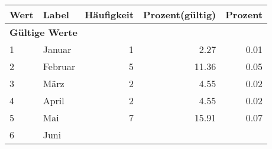      \begin{longtable}{lXrrr}
     \toprule
     \textbf{Wert} & \textbf{Label} & \textbf{Häufigkeit} & \textbf{Prozent(gültig)} & \textbf{Prozent} \\
     \endhead
     \midrule
     \multicolumn{5}{l}{\textbf{Gültige Werte}}\\

     1 &
     \multicolumn{1}{X}{ Januar   } &


       \num{1} &
       \num[round-mode=places,round-precision=2]{2,27} &
         \num[round-mode=places,round-precision=2]{0,01} \\

     2 &
     \multicolumn{1}{X}{ Februar   } &


       \num{5} &
       \num[round-mode=places,round-precision=2]{11,36} &
         \num[round-mode=places,round-precision=2]{0,05} \\

     3 &
     \multicolumn{1}{X}{ März   } &


       \num{2} &
       \num[round-mode=places,round-precision=2]{4,55} &
         \num[round-mode=places,round-precision=2]{0,02} \\

     4 &
     \multicolumn{1}{X}{ April   } &


       \num{2} &
       \num[round-mode=places,round-precision=2]{4,55} &
         \num[round-mode=places,round-precision=2]{0,02} \\

     5 &
     \multicolumn{1}{X}{ Mai   } &


       \num{7} &
       \num[round-mode=places,round-precision=2]{15,91} &
         \num[round-mode=places,round-precision=2]{0,07} \\

     6 &
     \multicolumn{1}{X}{ Juni   } &



\end{longtable}
